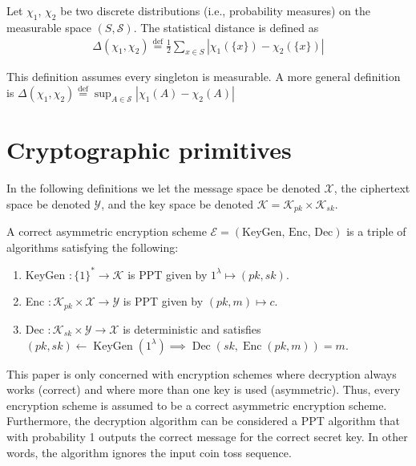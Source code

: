\begin{definition}
    Let $\chi_1$, $\chi_2$ be two discrete distributions (i.e., probability measures) on the measurable space $(S, \mathcal{S})$. The statistical distance is defined as
    \begin{equation*}
    \begin{aligned}
        \Delta(\chi_1, \chi_2) \stackrel{\mathrm{def}}{=} \frac{1}{2} \sum_{x \in S} |\chi_1(\{x\}) - \chi_2(\{x\})|
    \end{aligned}
    \end{equation*}
\end{definition}
\begin{remark}
    This definition assumes every singleton is measurable. A more general definition is $\Delta(\chi_1, \chi_2) \stackrel{\mathrm{def}}{=} \sup _{A \in \mathcal{S}}|\chi_1(A)-\chi_2(A)|$ 
\end{remark}


\section{Cryptographic primitives}

In the following definitions we let the message space be denoted $\mathcal{X}$, the ciphertext space be denoted $\mathcal{Y}$, and the key space be denoted $\mathcal{K} = \mathcal{K}_{pk} \times \mathcal{K}_{sk}$.

\begin{definition}
A correct asymmetric encryption scheme $\mathcal{E} = (\text{KeyGen, Enc, Dec})$ is a triple of algorithms satisfying the following:
\begin{enumerate}[label={$\bullet$}]
    \item KeyGen $\colon \{1\}^* \to \mathcal{K}$ is PPT given by $1^{\lambda} \mapsto (pk,sk)$.
    \item Enc $\colon \mathcal{K}_{pk} \times \mathcal{X} \to \mathcal{Y}$ is PPT given by $(pk,m) \mapsto c$.
    \item Dec $\colon \mathcal{K}_{sk} \times \mathcal{Y} \to \mathcal{X}$ is deterministic and satisfies $(pk, sk) \leftarrow \operatorname{KeyGen}(1^{\lambda}) \implies \operatorname{Dec}(sk, \operatorname{Enc}(pk,m)) = m$.
\end{enumerate}
\end{definition}
\begin{remark}
This paper is only concerned with encryption schemes where decryption always works (correct) and where more than one key is used (asymmetric). Thus, every encryption scheme is assumed to be a correct asymmetric encryption scheme. Furthermore, the decryption algorithm can be considered a PPT algorithm that with probability 1 outputs the correct message for the correct secret key. In other words, the algorithm ignores the input coin toss sequence.
\end{remark}

